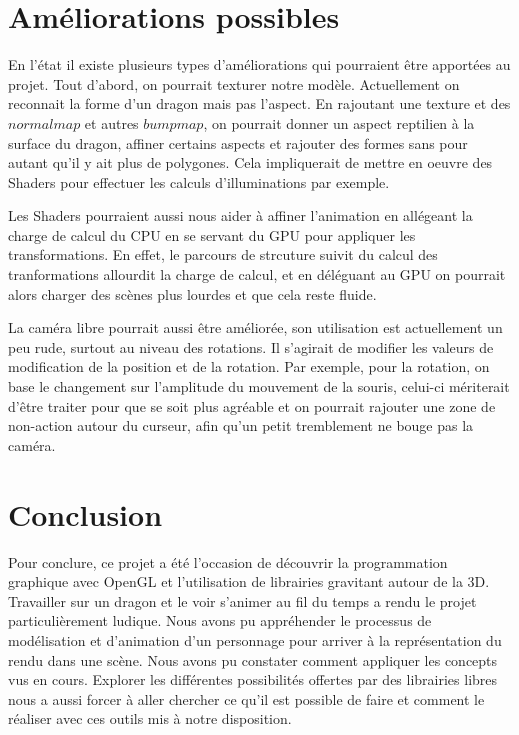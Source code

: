 \documentclass[a4paper]{report}
\begin{document}
\section{Améliorations possibles}
\par
En l'état il existe plusieurs types d'améliorations qui pourraient être apportées au projet. Tout d'abord, on pourrait texturer notre modèle. Actuellement on reconnait la forme d'un dragon mais pas l'aspect. En rajoutant une texture et des $normal map$ et autres $bump map$, on pourrait donner un aspect reptilien à la surface du dragon, affiner certains aspects et rajouter des formes sans pour autant qu'il y ait plus de polygones. Cela impliquerait de mettre en oeuvre des Shaders pour effectuer les calculs d'illuminations par exemple. 

Les Shaders pourraient aussi nous aider à affiner l'animation en allégeant la charge de calcul du CPU en se servant du GPU pour appliquer les transformations. En effet, le parcours de strcuture suivit du calcul des tranformations allourdit la charge de calcul, et en déléguant au GPU on pourrait alors charger des scènes plus lourdes et que cela reste fluide. 

La caméra libre pourrait aussi être améliorée, son utilisation est actuellement un peu rude, surtout au niveau des rotations. Il s'agirait de modifier les valeurs de modification de la position et de la rotation. Par exemple, pour la rotation, on base le changement sur l'amplitude du mouvement de la souris, celui-ci mériterait d'être traiter pour que se soit plus agréable et on pourrait rajouter une zone de non-action autour du curseur, afin qu'un petit tremblement ne bouge pas la caméra.

\section{Conclusion}
\par
Pour conclure, ce projet a été l'occasion de découvrir la programmation graphique avec OpenGL et l'utilisation de librairies gravitant autour de la 3D. Travailler sur un dragon et le voir s'animer au fil du temps a rendu le projet particulièrement ludique.
Nous avons pu appréhender le processus de modélisation et d'animation d'un personnage pour arriver à la représentation du rendu dans une scène. Nous avons pu constater comment appliquer les concepts vus en cours. Explorer les différentes possibilités offertes par des librairies libres nous a aussi forcer à aller chercher ce qu'il est possible de faire et comment le réaliser avec ces outils mis à notre disposition.
\end{document}
